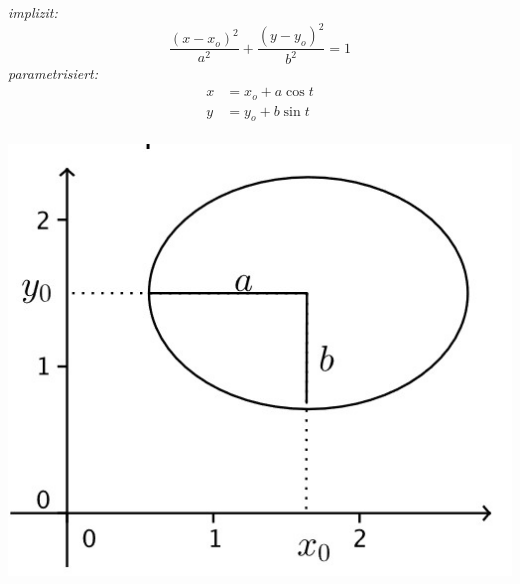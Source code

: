\vspace{3pt}
\begin{minipage}{0.5\linewidth}
        \vspace{0.5em}
        \textit{implizit:}
        $$
            \frac{(x - x_o)^2}{a^2}  + \frac{(y - y_o)^2}{b^2} = 1
        $$
        \textit{parametrisiert:}
        \begin{align*}
            x &= x_o + a\cos{t}\\
            y &= y_o + b\sin{t}\\
        \end{align*}
\end{minipage}
\begin{minipage}{0.49\linewidth}
        \includegraphics[width=0.8\linewidth]{src/Appendix/Ellipse.jpg}
\end{minipage}

